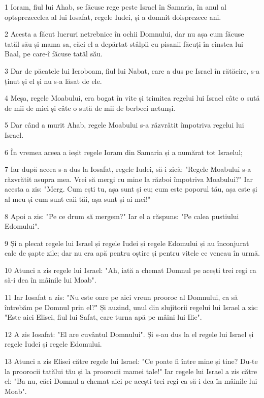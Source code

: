 \par 1 Ioram, fiul lui Ahab, se făcuse rege peste Israel în Samaria, în anul al optsprezecelea al lui Iosafat, regele Iudei, și a domnit doisprezece ani.
\par 2 Acesta a făcut lucruri netrebnice în ochii Domnului, dar nu așa cum făcuse tatăl său și mama sa, căci el a depărtat stâlpii cu pisanii făcuți în cinstea lui Baal, pe care-î făcuse tatăl său.
\par 3 Dar de păcatele lui Ieroboam, fiul lui Nabat, care a dus pe Israel în rătăcire, s-a ținut și el și nu s-a lăsat de ele.
\par 4 Meșa, regele Moabului, era bogat în vite și trimitea regelui lui Israel câte o sută de mii de miei și câte o sută de mii de berbeci netunși.
\par 5 Dar când a murit Ahab, regele Moabului s-a răzvrătit împotriva regelui lui Israel.
\par 6 În vremea aceea a ieșit regele Ioram din Samaria și a numărat tot Israelul;
\par 7 Iar după aceea s-a dus la Iosafat, regele Iudei, să-i zică: "Regele Moabului s-a răzvrătit asupra mea. Vrei să mergi cu mine la război împotriva Moabului?" Iar acesta a zis: "Merg. Cum ești tu, așa sunt și eu; cum este poporul tău, așa este și al meu și cum sunt caii tăi, așa sunt și ai mei!"
\par 8 Apoi a zis: "Pe ce drum să mergem?" Iar el a răspuns: "Pe calea pustiului Edomului".
\par 9 Și a plecat regele lui Israel și regele Iudei și regele Edomului și au înconjurat cale de șapte zile; dar nu era apă pentru oștire și pentru vitele ce veneau în urmă.
\par 10 Atunci a zis regele lui Israel: "Ah, iată a chemat Domnul pe acești trei regi ca să-i dea în mâinile lui Moab".
\par 11 Iar Iosafat a zis: "Nu este oare pe aici vreun prooroc al Domnului, ca să întrebăm pe Domnul prin el?" Și auzind, unul din slujitorii regelui lui Israel a zis: "Este aici Elisei, fiul lui Safat, care turna apă pe mâini lui Ilie".
\par 12 A zis Iosafat: "El are cuvântul Domnului". Și s-au dus la el regele lui Israel și regele Iudei și regele Edomului.
\par 13 Atunci a zis Elisei către regele lui Israel: "Ce poate fi între mine și tine? Du-te la proorocii tatălui tău și la proorocii mamei tale!" Iar regele lui Israel a zis către el: "Ba nu, căci Domnul a chemat aici pe acești trei regi ca să-i dea în mâinile lui Moab".
